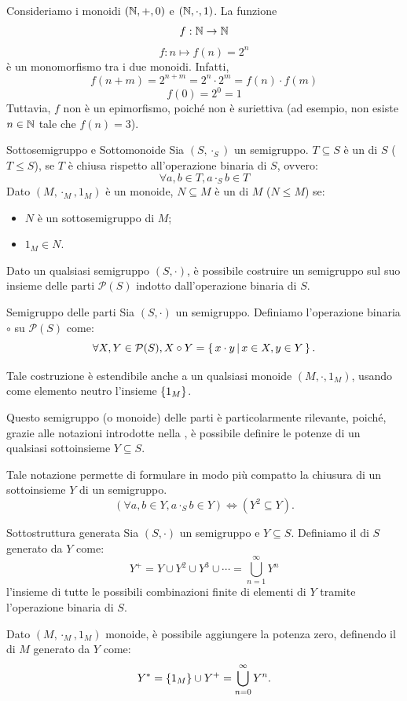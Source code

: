 \begin{example}{}
  Consideriamo i monoidi \((\mathbb{N}, +, 0)\) e \((\mathbb{N}, \cdot, 1)\).
  La funzione 
  \[f: \mathbb{N} \to \mathbb{N}\]
  \[f:n \mapsto f(n) = 2^n\]
  è un monomorfismo tra i due monoidi.
  Infatti,
  \[f(n+m) = 2^{n+m} = 2^n \cdot 2^m = f(n) \cdot f(m)\]
  \[ f(0) = 2^0 = 1\]
  Tuttavia, \(f\) non è un epimorfismo, poiché non è suriettiva (ad esempio, non esiste \(n \in \mathbb{N}\) tale che \(f(n) = 3\)).
\end{example}

\begin{definition}{Sottosemigruppo e Sottomonoide}
  Sia \((S,\cdot_S)\) un semigruppo.
  \(T \subseteq S\) è un  di \(S\) (\(T \leq S\)), se \(T\) è chiusa rispetto all'operazione binaria di \(S\), ovvero:
  \[\forall a,b \in T, a \cdot_S b \in T\]
  Dato \((M,\cdot_M,1_M)\) è un monoide, \(N \subseteq M\) è un  di \(M\) (\(N \leq M\)) se:
  \begin{itemize}
    \item \(N\) è un sottosemigruppo di \(M\);
    \item \(1_M \in N\).
  \end{itemize}
\end{definition}

Dato un qualsiasi semigruppo \((S,\cdot)\), è possibile costruire un semigruppo sul suo insieme delle parti \(\mathcal{P}(S)\) indotto dall'operazione binaria di \(S\).
\begin{definition}{Semigruppo delle parti}
  Sia \((S,\cdot)\) un semigruppo.
  Definiamo l'operazione binaria \(\circ\) su \(\mathcal{P}(S)\) come:
  \[\forall X,Y \in \mathcal{P}(S), X \circ Y = \set{x \cdot y}[ x \in X, y \in Y].\]
\end{definition}
Tale costruzione è estendibile anche a un qualsiasi monoide \((M,\cdot,1_M)\), usando come elemento neutro l'insieme \(\set{1_M}\).

Questo semigruppo (o monoide) delle parti è particolarmente rilevante, poiché, grazie alle notazioni introdotte nella , è possibile definire le potenze di un qualsiasi sottoinsieme \(Y \subseteq S\).

Tale notazione permette di formulare in modo più compatto la chiusura di un sottoinsieme \(Y\) di un semigruppo.
  \[(\forall a,b \in Y, a \cdot_S b \in Y)\iff (Y^2 \subseteq Y).\]

\begin{definition}{Sottostruttura generata}
  Sia \((S,\cdot)\) un semigruppo e \(Y \subseteq S\).
  Definiamo il  di \(S\) generato da \(Y\) come:
  \[Y^+ = Y \cup Y^2 \cup Y^3 \cup \cdots = \bigcup_{n=1}^{\infty} Y^n\]
  l'insieme di tutte le possibili combinazioni finite di elementi di \(Y\) tramite l'operazione binaria di \(S\).

  Dato \((M,\cdot_M,1_M)\) monoide, è possibile aggiungere la potenza zero, definendo il  di \(M\) generato da \(Y\) come:
  \[Y^* = \set{1_M} \cup Y^+ = \bigcup_{n=0}^{\infty} Y^n.\]
\end{definition}

